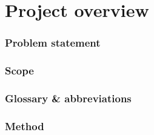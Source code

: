 \part{Project overview}
\section{Problem statement}
\section{Scope}
\section{Glossary \& abbreviations}
\section{Method}